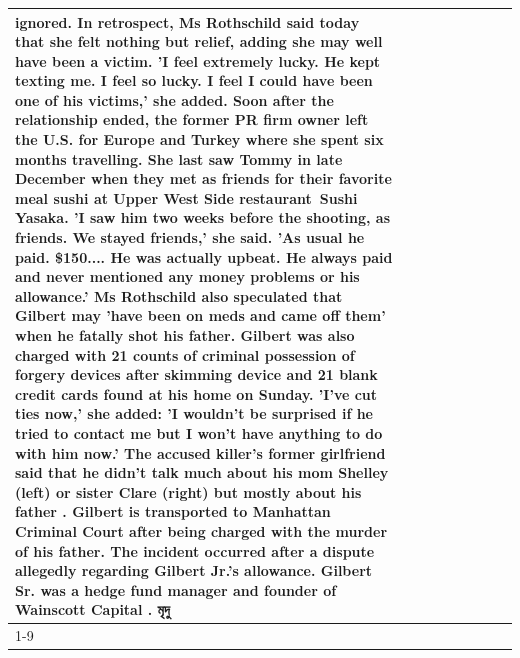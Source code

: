 \begin{table}[H]
\begin{tabular}{lllrlllll}
ignored. In retrospect, Ms Rothschild said today that she felt nothing but relief, adding she may well have been a victim. 'I feel extremely lucky. He kept texting me. I feel so lucky. I feel I could have been one of his victims,' she added. Soon after the relationship ended, the former PR firm owner left the U.S. for Europe and Turkey where she spent six months  travelling. She last saw Tommy in late December when they met as friends for their favorite meal sushi at Upper West Side restaurant Sushi Yasaka. 'I saw him two weeks before the shooting, as friends. We stayed friends,' she said. 'As usual he paid. \$150.... He was actually upbeat. He always paid and never mentioned any money problems or his allowance.' Ms Rothschild also speculated that Gilbert may 'have been on meds and came off them' when he fatally shot his father. Gilbert was also charged with 21 counts of criminal possession of forgery devices after skimming device and 21 blank credit cards found at his home on Sunday. 'I've cut ties now,' she added: 'I wouldn’t be surprised if he tried to contact me but I won’t have anything to do with him now.' The accused killer's former girlfriend said that he didn't talk much about his mom Shelley (left) or sister Clare (right) but mostly about his father . Gilbert is transported to Manhattan Criminal Court  after being charged with the murder of his father. The incident occurred after a dispute allegedly regarding Gilbert Jr.'s allowance. Gilbert Sr. was a hedge fund manager and founder of Wainscott Capital . মৃদু \\
\cline{1-9}

\end{tabular}
\end{table}
